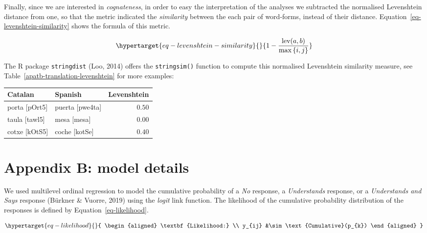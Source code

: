 \documentclass[
  man,
  floatsintext,
  colorlinks=true,linkcolor=blue,citecolor=blue,urlcolor=blue,biblatex]{apa7}
\begin{document}
Finally, since we are interested in \emph{cognateness}, in order to easy
the interpretation of the analyses we subtracted the normalised
Levenshtein distance from one, so that the metric indicated the
\emph{similarity} between the each pair of word-forms, instead of their
distance. Equation~\ref{eq-levenshtein-similarity} shows the formula of
this metric.

\begin{equation}\protect\hypertarget{eq-levenshtein-similarity}{}{
1-\frac{\text{lev}(a, b)}{\max{\{i, j}\}}
}\label{eq-levenshtein-similarity}\end{equation}

The R package \texttt{stringdist} (Loo, 2014) offers the
\texttt{stringsim()} function to compute this normalised Levenshtein
similarity measure, see Table~\ref{apatb-translation-levenshtein} for
more examples:

\begin{table}
\caption{Normalised Levenshtein similarity computed for three exemplars of translation pairs in our study}
\label{apatb-translation-levenshtein}

\begin{longtable*}{llr}
\toprule
Catalan & Spanish & Levenshtein \\ 
\midrule
porta [pOrt5] & puerta [pwe4ta] & $0.50$ \\ 
taula [tawl5] & mesa [mesa] & $0.00$ \\ 
cotxe [kOtS5] & coche [kotSe] & $0.40$ \\ 
\bottomrule
\end{longtable*}

\end{table}

\newpage{}

\hypertarget{appendix-b-model-details}{%
\section*{Appendix B: model details}\label{appendix-b-model-details}}

We used multilevel ordinal regression to model the cumulative
probability of a \emph{No} response, a \emph{Understands} response, or a
\emph{Understands and Says} response (Bürkner \& Vuorre, 2019) using the
\emph{logit} link function. The likelihood of the cumulative probability
distribution of the responses is defined by
Equation~\ref{eq-likelihood}.

\begin{equation}\protect\hypertarget{eq-likelihood}{}{
\begin{aligned}
\textbf{Likelihood:} \\
y_{ij} &\sim \text{Cumulative}(p_{k})
\end{aligned}
}\label{eq-likelihood}\end{equation}
\end{document}

